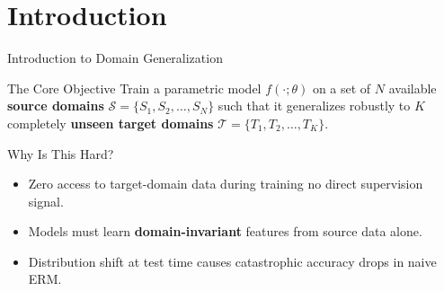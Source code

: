 \documentclass[t, aspectratio=169]{beamer} %
\begin{document}
	\section{Introduction}

	\begin{frame}{Introduction to Domain Generalization}
		\begin{block}{The Core Objective}
			Train a parametric model $f(\cdot;\theta)$ on a set of $N$ available \textbf{source domains} $\mathcal{S} = \{S_1, S_2, \dots, S_N\}$ such that it generalizes robustly to $K$ completely \textbf{unseen target domains} $\mathcal{T} = \{T_1, T_2, \dots, T_K\}$.
		\end{block}
		\begin{alertblock}{Why Is This Hard?}
			\begin{itemize}
				\item \alert{Zero access} to target-domain data during training no direct supervision signal.
				\item Models must learn \textbf{domain-invariant} features from source data alone.
				\item Distribution shift at test time causes catastrophic accuracy drops in naive ERM.
			\end{itemize}
		\end{alertblock}
	\end{frame}
\end{document}
